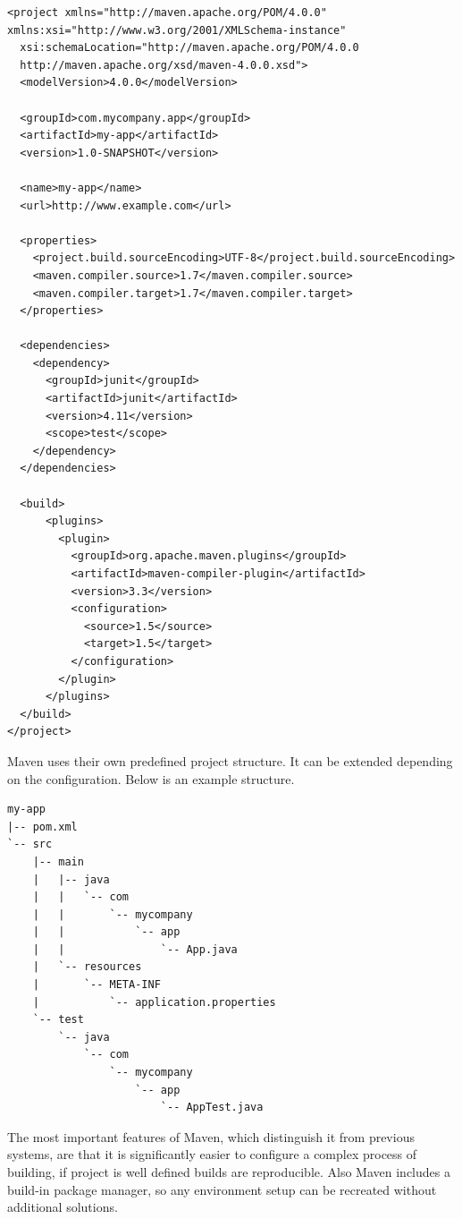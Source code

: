 \begin{verbatim}
<project xmlns="http://maven.apache.org/POM/4.0.0" 
xmlns:xsi="http://www.w3.org/2001/XMLSchema-instance"
  xsi:schemaLocation="http://maven.apache.org/POM/4.0.0
  http://maven.apache.org/xsd/maven-4.0.0.xsd">
  <modelVersion>4.0.0</modelVersion>
 
  <groupId>com.mycompany.app</groupId>
  <artifactId>my-app</artifactId>
  <version>1.0-SNAPSHOT</version>
 
  <name>my-app</name>
  <url>http://www.example.com</url>
 
  <properties>
    <project.build.sourceEncoding>UTF-8</project.build.sourceEncoding>
    <maven.compiler.source>1.7</maven.compiler.source>
    <maven.compiler.target>1.7</maven.compiler.target>
  </properties>
 
  <dependencies>
    <dependency>
      <groupId>junit</groupId>
      <artifactId>junit</artifactId>
      <version>4.11</version>
      <scope>test</scope>
    </dependency>
  </dependencies>
 
  <build>
      <plugins>
        <plugin>
          <groupId>org.apache.maven.plugins</groupId>
          <artifactId>maven-compiler-plugin</artifactId>
          <version>3.3</version>
          <configuration>
            <source>1.5</source>
            <target>1.5</target>
          </configuration>
        </plugin>
      </plugins>
  </build>
</project>
\end{verbatim}

Maven uses their own predefined project structure. It can be extended
depending on the configuration. Below is an example structure.

\begin{verbatim}
my-app
|-- pom.xml
`-- src
    |-- main
    |   |-- java
    |   |   `-- com
    |   |       `-- mycompany
    |   |           `-- app
    |   |               `-- App.java
    |   `-- resources
    |       `-- META-INF
    |           `-- application.properties
    `-- test
        `-- java
            `-- com
                `-- mycompany
                    `-- app
                        `-- AppTest.java
\end{verbatim}

The most important features of Maven, which distinguish it from previous
systems, are that it is significantly easier to configure a complex
process of building, if project is well defined builds are reproducible.
Also Maven includes a build-in package manager, so any environment setup
can be recreated without additional solutions.

